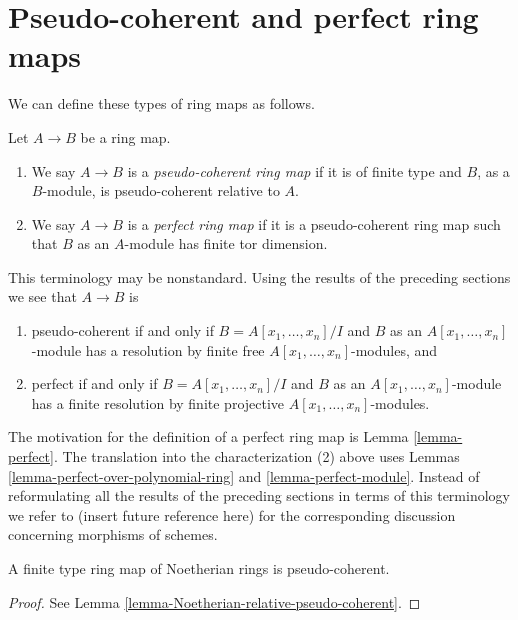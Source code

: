 \section{Pseudo-coherent and perfect ring maps}
\label{section-pseudo-coherent-perfect-ring-map}

\noindent
We can define these types of ring maps as follows.

\begin{definition}
\label{definition-pseudo-coherent-perfect}
Let $A \to B$ be a ring map.
\begin{enumerate}
\item We say $A \to B$ is a {\it pseudo-coherent ring map} if it is of finite
type and $B$, as a $B$-module, is pseudo-coherent relative to $A$.
\item We say $A \to B$ is a {\it perfect ring map} if it is a
pseudo-coherent ring map such that $B$ as an $A$-module has finite
tor dimension.
\end{enumerate}
\end{definition}

\noindent
This terminology may be nonstandard. Using the results of
the preceding sections we see that $A \to B$ is
\begin{enumerate}
\item pseudo-coherent if and only if $B = A[x_1, \ldots, x_n]/I$
and $B$ as an $A[x_1, \ldots, x_n]$-module has a resolution by
finite free $A[x_1, \ldots, x_n]$-modules, and
\item perfect  if and only if $B = A[x_1, \ldots, x_n]/I$
and $B$ as an $A[x_1, \ldots, x_n]$-module has a finite resolution by
finite projective $A[x_1, \ldots, x_n]$-modules.
\end{enumerate}
The motivation for the definition of a perfect ring map is
Lemma \ref{lemma-perfect}.
The translation into the characterization (2) above uses
Lemmas \ref{lemma-perfect-over-polynomial-ring} and \ref{lemma-perfect-module}.
Instead of reformulating all the results of the preceding sections
in terms of this terminology we refer to (insert future reference here)
for the corresponding discussion concerning morphisms of schemes.

\begin{lemma}
\label{lemma-Noetherian-pseudo-coherent-ring-map}
A finite type ring map of Noetherian rings is pseudo-coherent.
\end{lemma}

\begin{proof}
See
Lemma \ref{lemma-Noetherian-relative-pseudo-coherent}.
\end{proof}

